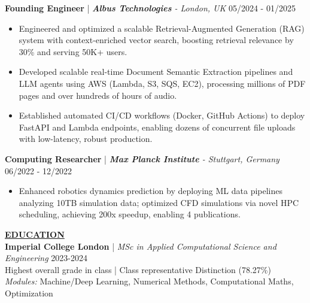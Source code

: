 \documentclass{article}
\newlength{\remaining}
\renewcommand{\section}[1]{
  \vspace{1.0em}\setlength{\remaining}{\textwidth-\widthof{\uppercase{#1}}}
    \noindent\underline{\fontsize{10}{15}\bfseries\uppercase{#1}\hspace*{\remaining}} \\
}
\renewcommand{\subsection}[3]{
    \noindent\textbf{#1} | \emph{#2} \hfill #3  
}
\begin{document}
    \subsection{Founding Engineer}{\textbf{Albus Technologies} - London, UK}{05/2024 - 01/2025}
    \begin{itemize}
        \item Engineered and optimized a scalable Retrieval-Augmented Generation (RAG) system with context-enriched vector search, boosting retrieval relevance by 30\% and serving 50K+ users.
        \item Developed scalable real-time Document Semantic Extraction pipelines and LLM agents using AWS (Lambda, S3, SQS, EC2), processing millions of PDF pages and over hundreds of hours of audio.
        \item Established automated CI/CD workflows (Docker, GitHub Actions) to deploy FastAPI and Lambda endpoints, enabling dozens of concurrent file uploads with low-latency, robust production.
    \end{itemize}
    

    \subsection{Computing Researcher}{\textbf{Max Planck Institute} - Stuttgart, Germany}{06/2022 - 12/2022}
    \begin{itemize}
        \item Enhanced robotics dynamics prediction by deploying ML data pipelines analyzing 10TB simulation data; optimized CFD simulations via novel HPC scheduling, achieving 200x speedup, enabling 4 publications.
    \end{itemize}

    
    \section{Education}
    \subsection{Imperial College London}{MSc in Applied Computational Science and Engineering}{2023-2024} \\
    Highest overall grade in class | Class representative  \hfill Distinction (78.27\%) \\
    \textit{Modules:} Machine/Deep Learning, Numerical Methods, Computational Maths, Optimization
    
    \vspace{0.25em}
\end{document}
